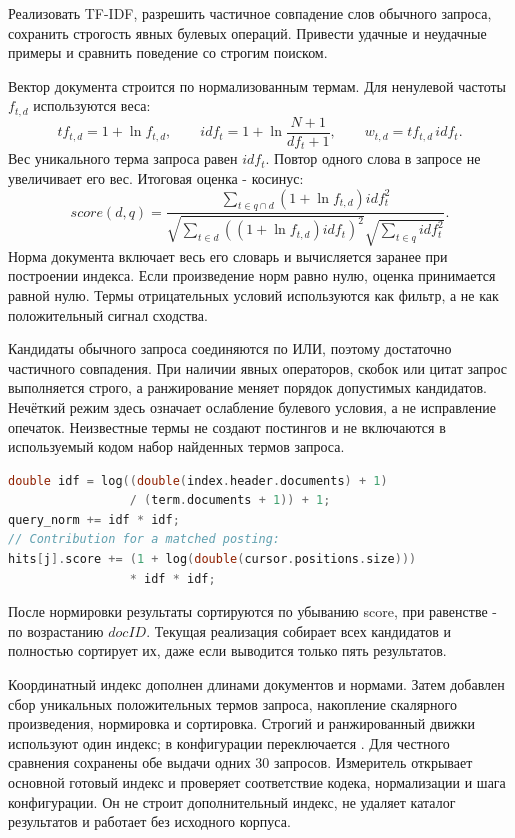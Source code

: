 \task
Реализовать TF-IDF, разрешить частичное совпадение слов обычного
запроса, сохранить строгость явных булевых операций. Привести удачные
и неудачные примеры и сравнить поведение со строгим поиском.

\method
Вектор документа строится по нормализованным термам. Для ненулевой
частоты \(f_{t,d}\) используются веса:
\[
tf_{t,d}=1+\ln f_{t,d},\qquad
idf_t=1+\ln\frac{N+1}{df_t+1},\qquad
w_{t,d}=tf_{t,d}\,idf_t.
\]
Вес уникального терма запроса равен \(idf_t\). Повтор одного слова
в запросе не увеличивает его вес. Итоговая оценка - косинус:
\[
score(d,q)=\frac{\sum_{t\in q\cap d}(1+\ln f_{t,d})idf_t^2}
{\sqrt{\sum_{t\in d}((1+\ln f_{t,d})idf_t)^2}
\sqrt{\sum_{t\in q}idf_t^2}}.
\]
Норма документа включает весь его словарь и вычисляется заранее
при построении индекса. Если произведение норм равно нулю,
оценка принимается равной нулю. Термы отрицательных условий
используются как фильтр, а не как положительный сигнал сходства.

Кандидаты обычного запроса соединяются по ИЛИ, поэтому достаточно
частичного совпадения. При наличии явных операторов, скобок или
цитат запрос выполняется строго, а ранжирование меняет порядок
допустимых кандидатов. Нечёткий режим здесь означает ослабление
булевого условия, а не исправление опечаток. Неизвестные термы
не создают постингов и не включаются в используемый кодом набор
найденных термов запроса.

\begin{lstlisting}[language=C++]
double idf = log((double(index.header.documents) + 1)
                 / (term.documents + 1)) + 1;
query_norm += idf * idf;
// Contribution for a matched posting:
hits[j].score += (1 + log(double(cursor.positions.size)))
                 * idf * idf;
\end{lstlisting}
После нормировки результаты сортируются по убыванию score,
при равенстве - по возрастанию \(docID\). Текущая реализация
собирает всех кандидатов и полностью сортирует их, даже если
выводится только пять результатов.

\journal
Координатный индекс дополнен длинами документов и нормами.
Затем добавлен сбор уникальных положительных термов запроса,
накопление скалярного произведения, нормировка и сортировка.
Строгий и ранжированный движки используют один индекс;
в конфигурации переключается .
Для честного сравнения сохранены обе выдачи одних 30 запросов.
Измеритель открывает основной готовый индекс и проверяет соответствие
кодека, нормализации и шага конфигурации. Он не строит дополнительный
индекс, не удаляет каталог результатов и работает без исходного корпуса.

